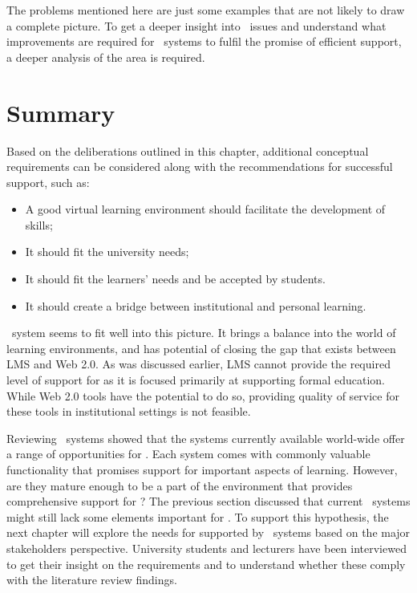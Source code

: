 The problems mentioned here are just some examples that are not likely to draw a
complete picture. To get a deeper insight into \ep~issues and understand what
improvements are required for \ep~systems to fulfil the promise of efficient
\LLLs support, a deeper analysis of the area is required.

\section{Summary}

Based on the deliberations outlined in this chapter, additional conceptual
requirements can be considered along with the recommendations for successful
\LLLs support, such as:

\begin{itemize}
	\item A good virtual learning environment should facilitate the development of
	\LLLs skills;
	\item It should fit the university needs;
	\item It should fit the learners' needs and be accepted by students. 
	\item It should create a bridge between institutional and personal learning.
\end{itemize}

\ep~system seems to fit well into this picture. It brings a balance into the
world of learning environments, and has potential of closing the gap that exists
between LMS and Web 2.0. As was discussed earlier, LMS cannot provide the
required level of support for \LLLs as it is focused primarily at supporting
formal education. While Web 2.0 tools have the potential to do so, providing
quality of service for these tools in institutional settings is not feasible.

Reviewing \ep~systems showed that the systems currently available world-wide
offer a range of opportunities for \LLLsn. Each system comes with commonly
valuable functionality that promises support for important aspects of learning.
However, are they mature enough to be a part of the environment that provides
comprehensive support for \LLLsn? The previous section discussed that current
\ep~systems might still lack some elements important for \LLLsn. To support this
hypothesis, the next chapter will explore the needs for \LLLs supported by
\ep~systems based on the major stakeholders perspective. University students and
lecturers have been interviewed to get their insight on the requirements and to
understand whether these comply with the literature review findings.

